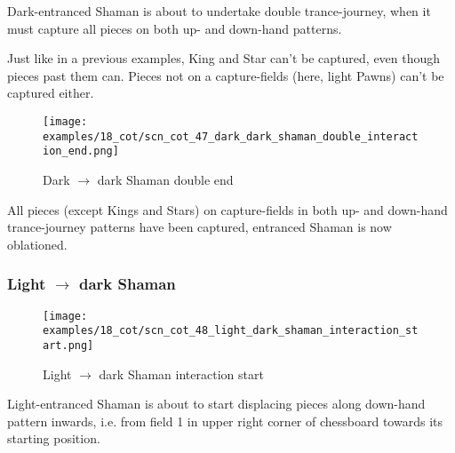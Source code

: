Dark-entranced Shaman is about to undertake double trance-journey, when it must
capture all pieces on both up- and down-hand patterns.

Just like in a previous examples, King and Star can't be captured, even though
pieces past them can. Pieces not on a capture-fields (here, light Pawns) can't
be captured either.

\clearpage %

\noindent
\begin{figure}[!h]
\texttt{[image: examples/18\_cot/scn\_cot\_47\_dark\_dark\_shaman\_double\_interaction\_end.png]}
\caption{Dark $\rightarrow$ dark Shaman double end}
\label{fig:scn_cot_47_dark_dark_shaman_double_interaction_end}
\end{figure}

All pieces (except Kings and Stars) on capture-fields in both up- and down-hand
trance-journey patterns have been captured, entranced Shaman is now oblationed.

\clearpage %

\subsubsection*{Light $\rightarrow$ dark Shaman}
\label{sec:Conquest of Tlalocan/Trance-journey/Interactions/Light --> dark Shaman}

\vspace*{-1.5\baselineskip}
\noindent
\begin{figure}[!h]
\texttt{[image: examples/18\_cot/scn\_cot\_48\_light\_dark\_shaman\_interaction\_start.png]}
\vspace*{-1.4\baselineskip}
\caption{Light $\rightarrow$ dark Shaman interaction start}
\label{fig:scn_cot_48_light_dark_shaman_interaction_start}
\end{figure}

\vspace*{-0.5\baselineskip}
Light-entranced Shaman is about to start displacing pieces along down-hand pattern
inwards, i.e. from field 1 in upper right corner of chessboard towards its starting
position.

